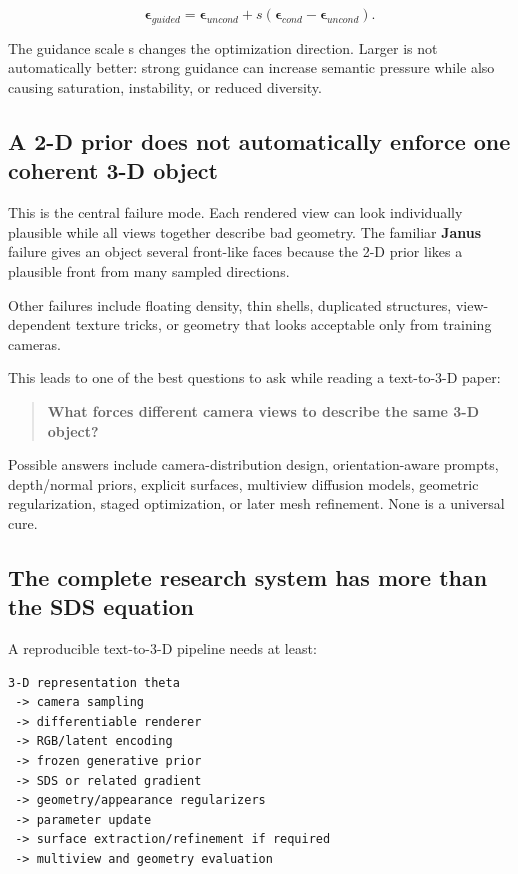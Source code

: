 \[\boldsymbol\epsilon_{guided}=\boldsymbol\epsilon_{uncond}+s(\boldsymbol\epsilon_{cond}-\boldsymbol\epsilon_{uncond}).\]

The guidance scale s changes the optimization direction. Larger is not automatically better: strong guidance can increase semantic pressure while also causing saturation, instability, or reduced diversity.

\subsection{A 2-D prior does not automatically enforce one coherent 3-D object}\label{04-visual-computing-ii-ch035-a-2-d-prior-does-not-automatically-enforce-one-coherent-3-d-object}

This is the central failure mode. Each rendered view can look individually plausible while all views together describe bad geometry. The familiar \textbf{Janus} failure gives an object several front-like faces because the 2-D prior likes a plausible front from many sampled directions.

Other failures include floating density, thin shells, duplicated structures, view-dependent texture tricks, or geometry that looks acceptable only from training cameras.

This leads to one of the best questions to ask while reading a text-to-3-D paper:

\begin{quote}
\textbf{What forces different camera views to describe the same 3-D object?}
\end{quote}

Possible answers include camera-distribution design, orientation-aware prompts, depth/normal priors, explicit surfaces, multiview diffusion models, geometric regularization, staged optimization, or later mesh refinement. None is a universal cure.

\subsection{The complete research system has more than the SDS equation}\label{04-visual-computing-ii-ch035-the-complete-research-system-has-more-than-the-sds-equation}

A reproducible text-to-3-D pipeline needs at least:

\begin{verbatim}
3-D representation theta
 -> camera sampling
 -> differentiable renderer
 -> RGB/latent encoding
 -> frozen generative prior
 -> SDS or related gradient
 -> geometry/appearance regularizers
 -> parameter update
 -> surface extraction/refinement if required
 -> multiview and geometry evaluation
\end{verbatim}

